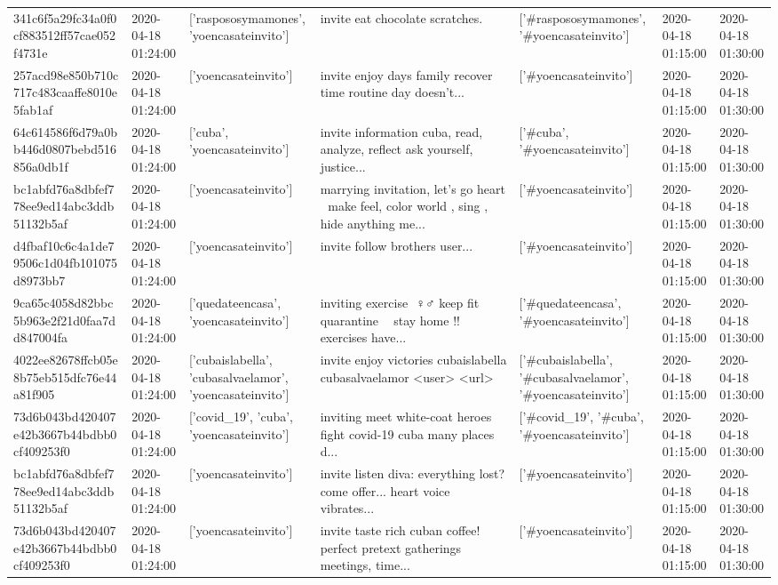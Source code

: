 \begin{tabular}{lllllll}
341c6f5a29fc34a0f0cf883512ff57cae052f4731e & 2020-04-18 01:24:00 & ['raspososymamones', 'yoencasateinvito'] & invite eat chocolate scratches. & ['#raspososymamones', '#yoencasateinvito'] & 2020-04-18 01:15:00 & 2020-04-18 01:30:00 \\
257acd98e850b710c717c483caaffe8010e5fab1af & 2020-04-18 01:24:00 & ['yoencasateinvito'] & invite enjoy days family recover time routine day doesn't... & ['#yoencasateinvito'] & 2020-04-18 01:15:00 & 2020-04-18 01:30:00 \\
64c614586f6d79a0bb446d0807bebd516856a0db1f & 2020-04-18 01:24:00 & ['cuba', 'yoencasateinvito'] & invite information cuba, read, analyze, reflect ask yourself, justice... & ['#cuba', '#yoencasateinvito'] & 2020-04-18 01:15:00 & 2020-04-18 01:30:00 \\
bc1abfd76a8dbfef778ee9ed14abc3ddb51132b5af & 2020-04-18 01:24:00 & ['yoencasateinvito'] & marrying invitation, let's go heart 💖 make feel, color world , sing , hide anything me... & ['#yoencasateinvito'] & 2020-04-18 01:15:00 & 2020-04-18 01:30:00 \\
d4fbaf10c6c4a1de79506c1d04fb101075d8973bb7 & 2020-04-18 01:24:00 & ['yoencasateinvito'] & invite follow brothers user... & ['#yoencasateinvito'] & 2020-04-18 01:15:00 & 2020-04-18 01:30:00 \\
9ca65c4058d82bbc5b963e2f21d0faa7dd847004fa & 2020-04-18 01:24:00 & ['quedateencasa', 'yoencasateinvito'] & inviting exercise ️ ♀️♂️ keep fit quarantine 💪💪 stay home !!️ exercises have... & ['#quedateencasa', '#yoencasateinvito'] & 2020-04-18 01:15:00 & 2020-04-18 01:30:00 \\
4022ee82678ffcb05e8b75eb515dfc76e44a81f905 & 2020-04-18 01:24:00 & ['cubaislabella', 'cubasalvaelamor', 'yoencasateinvito'] & invite enjoy victories cubaislabella cubasalvaelamor <user> <url> & ['#cubaislabella', '#cubasalvaelamor', '#yoencasateinvito'] & 2020-04-18 01:15:00 & 2020-04-18 01:30:00 \\
73d6b043bd420407e42b3667b44bdbb0cf409253f0 & 2020-04-18 01:24:00 & ['covid_19', 'cuba', 'yoencasateinvito'] & inviting meet white-coat heroes fight covid-19 cuba many places d... & ['#covid_19', '#cuba', '#yoencasateinvito'] & 2020-04-18 01:15:00 & 2020-04-18 01:30:00 \\
bc1abfd76a8dbfef778ee9ed14abc3ddb51132b5af & 2020-04-18 01:24:00 & ['yoencasateinvito'] & invite listen diva: everything lost? come offer... heart voice vibrates... & ['#yoencasateinvito'] & 2020-04-18 01:15:00 & 2020-04-18 01:30:00 \\
73d6b043bd420407e42b3667b44bdbb0cf409253f0 & 2020-04-18 01:24:00 & ['yoencasateinvito'] & invite taste rich cuban coffee! perfect pretext gatherings meetings, time... & ['#yoencasateinvito'] & 2020-04-18 01:15:00 & 2020-04-18 01:30:00 \\

\end{tabular}
